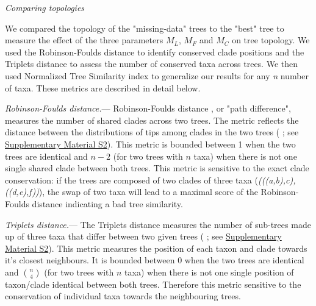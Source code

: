 \documentclass[12pt,letterpaper]{article}
\renewcommand{\subsection}[1]{%
\bigskip
\begin{center}
\begin{large}
\normalfont\itshape #1
\end{large}
\end{center}}
\renewcommand{\subsubsection}[1]{%
\vspace{2ex}
\noindent
\textit{#1.}---}
\begin{document}

\subsection{Comparing topologies}
We compared the topology of the "missing-data" trees to the "best" tree to measure the effect of the three parameters $M_{L}$, $M_{F}$ and $M_{C}$ on tree topology. We used the Robinson-Foulds distance \citep{RF1981} to identify conserved clade positions and the Triplets distance \citep{dobson1975triplets} to assess the number of conserved taxa across trees. We then used Normalized Tree Similarity index \citep{Bogdanowicz2012} to generalize our results for any \textit{n} number of taxa. These metrics are described in detail below.

\subsubsection{Robinson-Foulds distance}
Robinson-Foulds distance \citep{RF1981}, or "path difference", measures the number of shared clades across two trees. The metric reflects the distance between the distributions of tips among clades in the two trees (\citealt{RF1981} ; see \hyperref[SupplementaryMaterial]{Supplementary Material S2}). This metric is bounded between 1 when the two trees are identical and $n-2$ (for two trees with $n$ taxa) when there is not one single shared clade between both trees. This metric is sensitive to the exact clade conservation: if the trees are composed of two clades of three taxa (\textit{(((a,b),c),((d,e),f))}), the swap of two taxa will lead to a maximal score of the Robinson-Foulds distance indicating a bad tree similarity.

\subsubsection{Triplets distance}
The Triplets distance \citep{dobson1975triplets} measures the number of sub-trees made up of three taxa that differ between two given trees (\citealt{critchlowthe1996} ; see \hyperref[SupplementaryMaterial]{Supplementary Material S2}). This metric measures the position of each taxon and clade towards it's closest neighbours. It is bounded between 0 when the two trees are identical and $\binom{n}{4}$ (for two trees with $n$ taxa) when there is not one single position of taxon/clade identical between both trees. Therefore this metric sensitive to the conservation of individual taxa towards the neighbouring trees.
\end{document}
